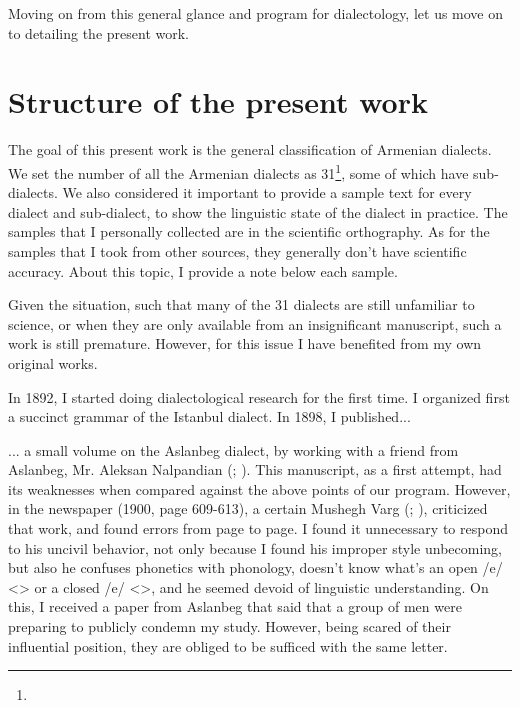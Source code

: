 Moving on from this general glance and program for dialectology, let us move on to detailing the present work. 

\section{Structure of the present work}

The goal of this present work is the general classification of Armenian dialects. We set the number of all the Armenian dialects as 31\footnote{}, some of which have sub-dialects. We also considered it important to provide a sample text for every dialect and sub-dialect, to show the linguistic state of the dialect in practice. The samples that I personally collected are in the scientific orthography. As for the samples that I took from other sources, they generally don't have scientific accuracy. About this topic, I provide a note below each sample. 

Given the situation, such that many of the 31 dialects are still unfamiliar to science, or when they are only available from an insignificant manuscript, such a work is still premature. However, for this issue I have benefited from my own original works. 

In 1892, I started doing dialectological research for the first time. I organized first a succinct grammar of the Istanbul dialect. In 1898, I published... 
\begin{adjarianpage}\label{page:13}\end{adjarianpage}%


... a small volume on the Aslanbeg dialect, by working with a friend from Aslanbeg, Mr. Aleksan Nalpandian (; ). This manuscript, as a first attempt, had its weaknesses when compared against the above points of our program. However, in the  newspaper (1900, page 609-613), a certain Mushegh Varg (; ), criticized that work, and found errors from page to page. I found it unnecessary to respond to his uncivil behavior, not only because I found his improper style unbecoming, but also he confuses phonetics with phonology, doesn't know what's an open /e/ <> or a closed /e/ <>, and he seemed devoid of linguistic understanding. On this, I received a paper from Aslanbeg that said that a group of men were preparing to publicly condemn my study. However, being scared of their influential position, they are obliged to be sufficed with the same letter. 

